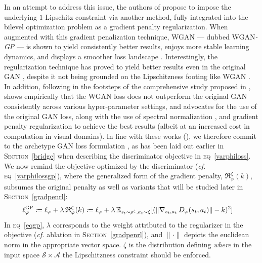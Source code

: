 In an attempt to address this issue,
the authors of \cite{Gulrajani2017-mr} propose to impose the underlying
$1$-Lipschitz constraint via another method,
fully integrated into the bilevel optimization problem
as a gradient penalty regularization.
When augmented with this gradient penalization technique,
WGAN --- dubbed WGAN\textit{-GP} --- is shown to yield consistently better
results, enjoys more stable learning dynamics,
and displays a smoother loss landscape \cite{Gulrajani2017-mr}.
Interestingly, the regularization technique has proved
to yield better results even in the original GAN \cite{Lucic2017-nz},
despite it not being grounded on the Lipschitzness footing like WGAN \cite{Arjovsky2017-la}.
In addition, following in the footsteps of the comprehensive study proposed in \cite{Lucic2017-nz},
\cite{Kurach2018-cs} shows empirically that the WGAN loss does not outperform
the original GAN consistently across various hyper-parameter settings,
and advocates for the use of the original GAN loss,
along with the use of spectral normalization \cite{Miyato2018-wc},
and gradient penalty regularization \cite{Gulrajani2017-mr}
to achieve the best results
(albeit at an increased cost in computation in visual domains).
In line with these works (\cite{Lucic2017-nz,Kurach2018-cs}),
we therefore commit to the archetype GAN loss formulation \cite{Goodfellow2014-yk},
as has been laid out earlier in \textsc{Section}~\ref{bridge}
when describing the discriminator objective in \textsc{eq}~\ref{varphiloss}.
We now remind the objective optimized by the discriminator
(\textit{cf.} \textsc{eq}~\ref{varphilossgp}),
where the generalized form of the gradient penalty, $\mathfrak{R}_\varphi^\zeta (k)$,
subsumes the original penalty \cite{Gulrajani2017-mr} as well as variants
that will be studied later in \textsc{Section}~\ref{gradpenrl}:
\begin{align}
\ell_\varphi^\textsc{GP}
&\coloneqq \ell_\varphi + \lambda \, \mathfrak{R}_\varphi^\zeta (k)
\coloneqq \ell_\varphi + \lambda \,
\mathbb{E}_{s_t \sim \rho^{\zeta}, a_t \sim \zeta}
[(\lVert  \nabla _{s_t,a_t} \, D_\varphi(s_t,a_t) \rVert - k )^2]
\label{eqgp}
\end{align}
In \textsc{eq}~\ref{eqgp}, $\lambda$ corresponds to the weight attributed to the
regularizer in the objective (\textit{cf.} ablation in \textsc{Section}~\ref{gradpenrl}),
and $\lVert \cdot \rVert$ depicts the euclidean norm in the appropriate vector space.
$\zeta$ is the distribution defining \emph{where}
in the input space $\mathcal{S} \times \mathcal{A}$ the Lipschitzness constraint
should be enforced.

